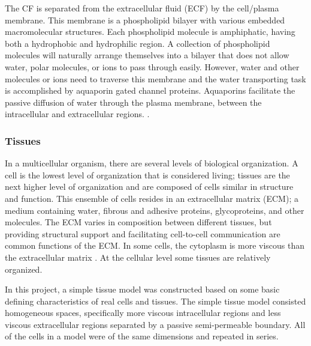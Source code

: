 	The CF is separated from the extracellular fluid (ECF) by the cell/plasma membrane. This membrane is a phospholipid bilayer with various embedded macromolecular structures. Each phospholipid molecule is amphiphatic, having both a hydrophobic and hydrophilic region. A collection of phospholipid molecules will naturally arrange themselves into a bilayer that does not allow water, polar molecules, or ions to pass through easily. However, water and other molecules or ions need to traverse this membrane and the water transporting task is accomplished by aquaporin gated channel proteins. Aquaporins facilitate the passive diffusion of water through the plasma membrane, between the intracellular and extracellular regions. \citep{ap}.
	
	

\subsubsection{Tissues}
	In a multicellular organism, there are several levels of biological organization. A cell is the lowest level of organization that is considered living; tissues are the next higher level of organization and are composed of cells similar in structure and function. This ensemble of cells resides in an extracellular matrix (ECM); a medium containing water, fibrous and adhesive proteins, glycoproteins, and other molecules. The ECM varies in composition between different tissues, but providing structural support and facilitating cell-to-cell communication are common functions of the ECM. In some cells, the cytoplasm is more viscous than the extracellular matrix \citep{cr-biology}. At the cellular level some tissues are relatively organized.
	
	In this project, a simple tissue model was constructed based on some basic defining characteristics of real cells and tissues. The simple tissue model consisted homogeneous spaces, specifically more viscous intracellular regions and less viscous extracellular regions separated by a passive semi-permeable boundary. All of the cells in a model were of the same dimensions and repeated in series.











